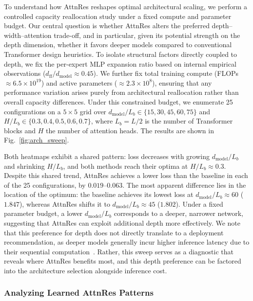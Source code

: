 


To understand how AttnRes reshapes optimal architectural scaling, we perform a controlled capacity reallocation study under a fixed compute and parameter budget. Our central question is whether AttnRes alters the preferred depth–width–attention trade-off, and in particular, given its potential strength on the depth dimension, whether it favors deeper models compared to conventional Transformer design heuristics. To isolate structural factors directly coupled to depth, we fix the per-expert MLP expansion ratio based on internal empirical observations ($d_{\mathrm{ff}}/d_{\mathrm{model}} \approx 0.45$). We further fix total training compute (FLOPs $\approx 6.5\times10^{19}$) and active parameters ($\approx 2.3\times10^8$), ensuring that any performance variation arises purely from architectural reallocation rather than overall capacity differences. Under this constrained budget, we enumerate 25 configurations on a $5\times5$ grid over
$d_{\mathrm{model}}/L_b \in \{15, 30, 45, 60, 75\}$ and
$H/L_b \in \{0.3, 0.4, 0.5, 0.6, 0.7\}$,
where $L_b = L/2$ is the number of Transformer blocks and $H$ the number of attention heads.
The results are shown in Fig.~\ref{fig:arch_sweep}.

Both heatmaps exhibit a shared pattern: loss decreases with growing $d_{\mathrm{model}}/L_b$ and shrinking $H/L_b$, and both methods reach their optima at $H/L_b \approx 0.3$.
Despite this shared trend, AttnRes achieves a lower loss than the baseline in each of the 25 configurations, by $0.019$--$0.063$.
The most apparent difference lies in the location of the optimum: the baseline achieves its lowest loss at $d_{\mathrm{model}}/L_b \approx 60$ ($1.847$), whereas AttnRes shifts it to $d_{\mathrm{model}}/L_b \approx 45$ ($1.802$).
Under a fixed parameter budget, a lower $d_{\mathrm{model}}/L_b$ corresponds to a deeper, narrower network, suggesting that AttnRes can exploit additional depth more effectively.
We note that this preference for depth does not directly translate to a deployment recommendation, as deeper models generally incur higher inference latency due to their sequential computation~\citep{pope-2022-efficiently}.
Rather, this sweep serves as a diagnostic that reveals where AttnRes benefits most, and this depth preference can be factored into the architecture selection alongside inference cost.


\subsubsection{Analyzing Learned AttnRes Patterns}

